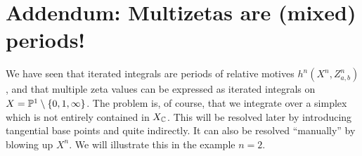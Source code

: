 

\section{Addendum: Multizetas are (mixed) periods!}

We have seen that iterated integrals are periods of relative motives $h^n(X^n, Z^n_{a,b})$, and that
multiple zeta values can be expressed as iterated integrals on $X= \mathbb{P}^1 \setminus \{0, 1, \infty\}$.
The problem is, of course, that we integrate over a simplex which is not entirely contained in $X_{\mathbb{C}}$.
This will be resolved later by introducing tangential base points and quite indirectly. 
It can also be resolved ``manually'' by blowing up $X^n$. We will illustrate this in the example $n=2$.





